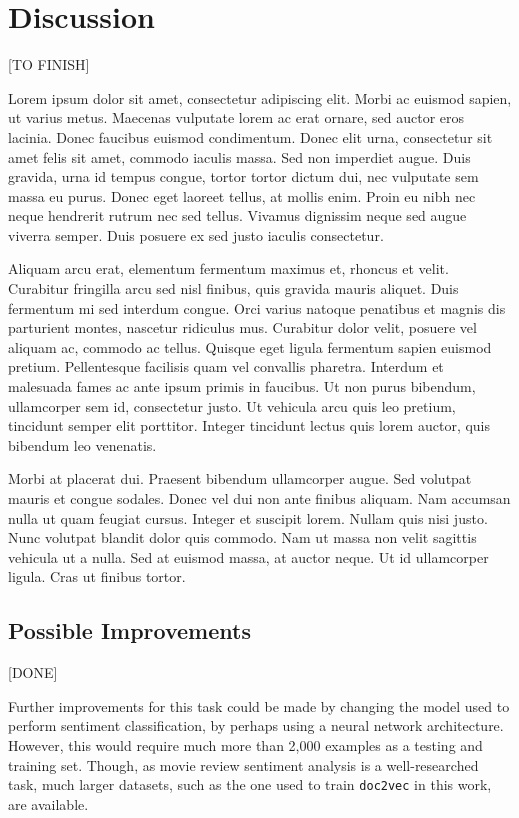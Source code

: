 \documentclass[twocolumn]{article}
\begin{document}
\section{Discussion}

[TO FINISH]

Lorem ipsum dolor sit amet, consectetur adipiscing elit. Morbi ac euismod sapien, ut varius metus. Maecenas vulputate lorem ac erat ornare, sed auctor eros lacinia. Donec faucibus euismod condimentum. Donec elit urna, consectetur sit amet felis sit amet, commodo iaculis massa. Sed non imperdiet augue. Duis gravida, urna id tempus congue, tortor tortor dictum dui, nec vulputate sem massa eu purus. Donec eget laoreet tellus, at mollis enim. Proin eu nibh nec neque hendrerit rutrum nec sed tellus. Vivamus dignissim neque sed augue viverra semper. Duis posuere ex sed justo iaculis consectetur.

Aliquam arcu erat, elementum fermentum maximus et, rhoncus et velit. Curabitur fringilla arcu sed nisl finibus, quis gravida mauris aliquet. Duis fermentum mi sed interdum congue. Orci varius natoque penatibus et magnis dis parturient montes, nascetur ridiculus mus. Curabitur dolor velit, posuere vel aliquam ac, commodo ac tellus. Quisque eget ligula fermentum sapien euismod pretium. Pellentesque facilisis quam vel convallis pharetra. Interdum et malesuada fames ac ante ipsum primis in faucibus. Ut non purus bibendum, ullamcorper sem id, consectetur justo. Ut vehicula arcu quis leo pretium, tincidunt semper elit porttitor. Integer tincidunt lectus quis lorem auctor, quis bibendum leo venenatis.

Morbi at placerat dui. Praesent bibendum ullamcorper augue. Sed volutpat mauris et congue sodales. Donec vel dui non ante finibus aliquam. Nam accumsan nulla ut quam feugiat cursus. Integer et suscipit lorem. Nullam quis nisi justo. Nunc volutpat blandit dolor quis commodo. Nam ut massa non velit sagittis vehicula ut a nulla. Sed at euismod massa, at auctor neque. Ut id ullamcorper ligula. Cras ut finibus tortor.

\subsection{Possible Improvements}

[DONE]

Further improvements for this task could be made by changing the model used to perform sentiment classification, by perhaps using a neural network architecture. However, this would require much more than 2,000 examples as a testing and training set. Though, as movie review sentiment analysis is a well-researched task, much larger datasets, such as the one used to train \texttt{doc2vec} in this work, are available.
\end{document}
